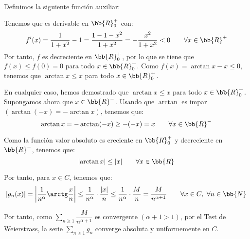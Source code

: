 \begin{ejercicio}
\begin{description}
        Definimos la siguiente función auxiliar:
        
        Tenemos que es derivable en $\bb{R}^+_0$ con:
        \begin{equation*}
            f'(x) = \frac{1}{1+x^2} - 1 = \frac{1-1-x^2}{1+x^2} = -\frac{x^2}{1+x^2} < 0 \qquad \forall x\in \bb{R}^+
        \end{equation*}
        Por tanto, $f$ es decreciente en $\bb{R}^+_0$, por lo que se tiene que $f(x) \leq f(0) = 0$ para todo $x\in \bb{R}^+_0$.
        Como $f(x)=\arctan x -x\leq 0$, tenemos que $\arctan x \leq x$ para todo $x\in \bb{R}^+_0$. 
    \end{description}

    En cualquier caso, hemos demostrado que $\arctan x \leq x$ para todo $x\in \bb{R}^+_0$. Supongamos ahora que $x\in \bb{R}^-$. Usando que
    $\arctan$ es impar $(\arctan(-x) = -\arctan x)$, tenemos que:
    \begin{equation*}
        \arctan x = -\arctan(-x) \geq -(-x) = x \qquad \forall x\in \bb{R}^-
    \end{equation*}
    
    Como la función valor absoluto es creciente en $\bb{R}^+_0$ y decreciente en $\bb{R}^-$, tenemos que:
    \begin{equation*}
        \left|\arctan x\right| \leq |x| \qquad \forall x\in \bb{R}
    \end{equation*}

    Por tanto, para $x\in C$, tenemos que:
    \begin{equation*}
        \left|g_n(x)\right| = \left|\frac{1}{n^\alpha} \arctg \frac{x}{n}\right| \leq \frac{1}{n^\alpha} \cdot \frac{|x|}{n} \leq \frac{1}{n^\alpha} \cdot \frac{M}{n} = \frac{M}{n^{\alpha+1}} \qquad \forall x\in C,~\forall n\in \bb{N}
    \end{equation*}

    Por tanto, como $\sum\limits_{n\geq 1}\dfrac{M}{n^{\alpha+1}}$ es convergente $(\alpha+1>1)$, por el Test de Weierstrass, la serie $\sum\limits_{n\geq 1}g_n$ converge absoluta y uniformemente en $C$.    
\end{ejercicio}

